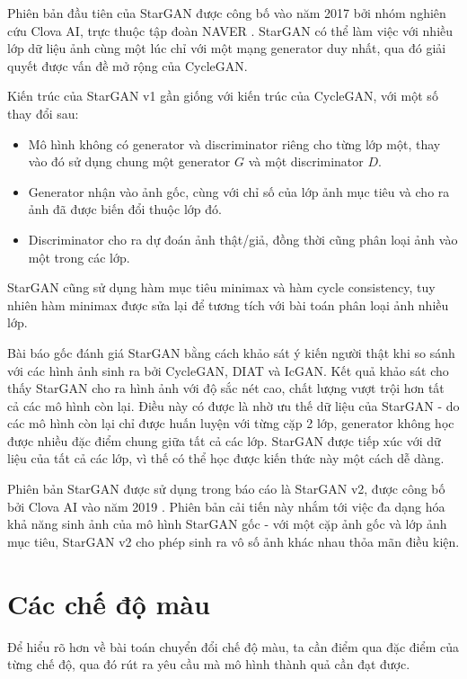 \documentclass[12pt]{extreport}
\begin{document}
Phiên bản đầu tiên của StarGAN được công bố vào năm 2017 bởi nhóm nghiên cứu Clova AI, trực thuộc tập đoàn NAVER \cite{DBLP:journals/corr/abs-1711-09020}. StarGAN có thể làm việc với nhiều lớp dữ liệu ảnh cùng một lúc chỉ với một mạng generator duy nhất, qua đó giải quyết được vấn đề mở rộng của CycleGAN.

Kiến trúc của StarGAN v1 gần giống với kiến trúc của CycleGAN, với một số thay đổi sau:
\begin{itemize}
    \item Mô hình không có generator và discriminator riêng cho từng lớp một, thay vào đó sử dụng chung một generator $ G $ và một discriminator $ D $.
    \item Generator nhận vào ảnh gốc, cùng với chỉ số của lớp ảnh mục tiêu và cho ra ảnh đã được biến đổi thuộc lớp đó.
    \item Discriminator cho ra dự đoán ảnh thật/giả, đồng thời cũng phân loại ảnh vào một trong các lớp.
\end{itemize}

StarGAN cũng sử dụng hàm mục tiêu minimax và hàm cycle consistency, tuy nhiên hàm minimax được sửa lại để tương tích với bài toán phân loại ảnh nhiều lớp.

Bài báo gốc đánh giá StarGAN bằng cách khảo sát ý kiến người thật khi so sánh với các hình ảnh sinh ra bởi CycleGAN, DIAT và IcGAN. Kết quả khảo sát cho thấy StarGAN cho ra hình ảnh với độ sắc nét cao, chất lượng vượt trội hơn tất cả các mô hình còn lại. Điều này có được là nhờ ưu thế dữ liệu của StarGAN - do các mô hình còn lại chỉ được huấn luyện với từng cặp 2 lớp, generator không học được nhiều đặc điểm chung giữa tất cả các lớp. StarGAN được tiếp xúc với dữ liệu của tất cả các lớp, vì thế có thể học được kiến thức này một cách dễ dàng.

Phiên bản StarGAN được sử dụng trong báo cáo là StarGAN v2, được công bố bởi Clova AI vào năm 2019 \cite{DBLP:journals/corr/abs-1912-01865}. Phiên bản cải tiến này nhắm tới việc đa dạng hóa khả năng sinh ảnh của mô hình StarGAN gốc - với một cặp ảnh gốc và lớp ảnh mục tiêu, StarGAN v2 cho phép sinh ra vô số ảnh khác nhau thỏa mãn điều kiện.

\section{Các chế độ màu}

Để hiểu rõ hơn về bài toán chuyển đổi chế độ màu, ta cần điểm qua đặc điểm của từng chế độ, qua đó rút ra yêu cầu mà mô hình thành quả cần đạt được.
\end{document}

